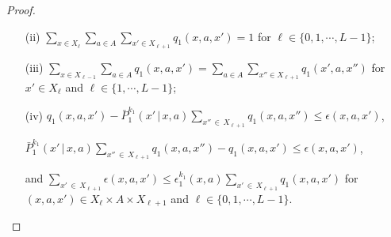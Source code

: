 \documentclass[12pt, final]{l4dc2023}
\begin{document}
\begin{proof}
\begin{itemize}
		\item [(ii)] $\sum_{x\in X_\ell}\sum_{a\in A}\sum_{x'\in X_{\ell+1}} q_1(x, a, x') = 1$ for $\ell \in\{0,1,\cdots,L-1\}$; 
		
		\item [(iii)] $\sum_{x\in X_{\ell-1}}\sum_{a\in A} q_1(x, a, x') =\sum_{a\in A}\sum_{x''\in X_{\ell+1}} q_1(x', a, x'')$ for $x'\in X_\ell$ and $\ell \in\{1,\cdots,L-1\}$;
		
		\item [(iv)] 
		$q_1(x,a,x')-\bar P_1^{k_1}(x'\,\vert\,x,a) \sum_{x''\,\in\,X_{\ell+1}}q_1(x,a,x'') \leq \epsilon(x,a,x')$, 
		
		$\bar P_1^{k_1}(x'\,\vert\,x,a) \sum_{x''\,\in\,X_{\ell+1}}q_1(x,a,x'')-q_1(x,a,x') \leq \epsilon(x,a,x')$, 
		
		and $\sum_{x'\,\in\,X_{\ell+1}} \epsilon(x,a,x') \leq \epsilon_1^{k_1}(x,a) \sum_{x'\,\in\,X_{\ell+1}}q_1(x,a,x')$ for $(x,a,x')\in X_\ell \times A\times X_{\ell+1}$ and $\ell \in\{0,1,\cdots,L-1\}$.
	\end{itemize}
	

\end{proof}
\end{document}
